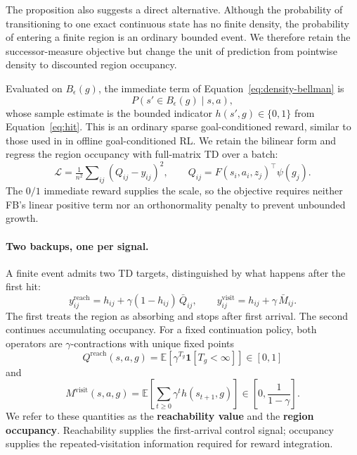 \documentclass{article}
\newcommand{\E}{\mathbb{E}}
\newcommand{\ind}[1]{\mathbf{1}\!\left[#1\right]}
\newcommand{\Reach}{\mathrm{reach}}
\newcommand{\Visit}{\mathrm{visit}}
\begin{document}
The proposition also suggests a direct alternative.
Although the probability of transitioning to one exact continuous state has no finite density, the probability of entering a finite region is an ordinary bounded event.
We therefore retain the successor-measure objective but change the unit of prediction from pointwise density to discounted region occupancy.

Evaluated on $B_\epsilon(g)$, the immediate term of Equation~\ref{eq:density-bellman} is
\begin{equation}
P(s'\in B_\epsilon(g)\mid s,a),
\end{equation}
whose sample estimate is the bounded indicator $h(s',g)\in\{0,1\}$ from Equation~\ref{eq:hit}.
This is an ordinary sparse goal-conditioned reward, similar to those used in in offline goal-conditioned RL.
We retain the bilinear form and regress the region occupancy with full-matrix TD over a batch:
\begin{equation}
\label{eq:matrix-loss}
\mathcal{L}
=
\tfrac{1}{n^2}\sum\nolimits_{ij}(Q_{ij}-y_{ij})^2,
\qquad
Q_{ij}=F(s_i,a_i,z_j)^{\top}\psi(g_j).
\end{equation}
The $0/1$ immediate reward supplies the scale, so the objective requires neither FB's linear positive term nor an orthonormality penalty to prevent unbounded growth.

\paragraph{Two backups, one per signal.}
A finite event admits two TD targets, distinguished by what happens after the first hit:
\begin{equation}
\label{eq:backups}
y^{\Reach}_{ij}
=
h_{ij}+\gamma(1-h_{ij})\,\bar Q_{ij},
\qquad
 y^{\Visit}_{ij}
=
h_{ij}+\gamma\,\bar M_{ij}.
\end{equation}
The first treats the region as absorbing and stops after first arrival.
The second continues accumulating occupancy.
For a fixed continuation policy, both operators are $\gamma$-contractions with unique fixed points
\begin{equation}
Q^{\Reach}(s,a,g)
=
\E[\gamma^{T_g}\ind{T_g<\infty}]
\in[0,1]
\end{equation}
and
\begin{equation}
M^{\Visit}(s,a,g)
=
\E\!\left[\sum_{t\ge0}\gamma^t h(s_{t+1},g)\right]
\in\left[0,\frac{1}{1-\gamma}\right].
\end{equation}
We refer to these quantities as the \textbf{reachability value} and the \textbf{region occupancy}.
Reachability supplies the first-arrival control signal; occupancy supplies the repeated-visitation information required for reward integration.
\end{document}
